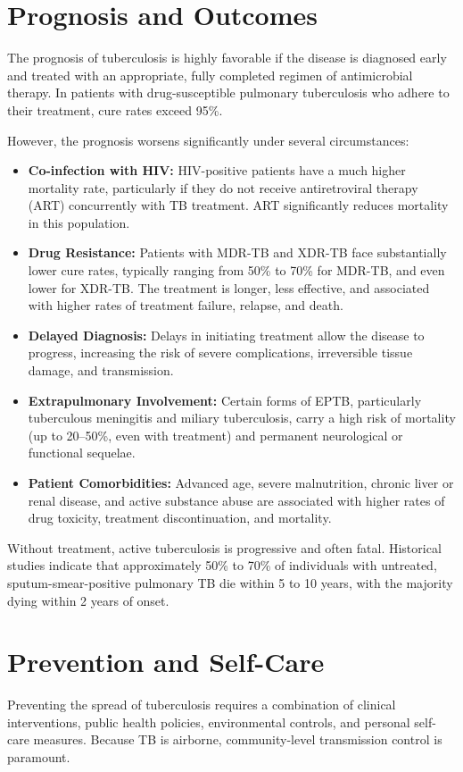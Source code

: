 \section*{Prognosis and Outcomes}
The prognosis of tuberculosis is highly favorable if the disease is diagnosed early and treated with an appropriate, fully completed regimen of antimicrobial therapy. In patients with drug-susceptible pulmonary tuberculosis who adhere to their treatment, cure rates exceed 95\%.

However, the prognosis worsens significantly under several circumstances:
\begin{itemize}
    \item \textbf{Co-infection with HIV:} HIV-positive patients have a much higher mortality rate, particularly if they do not receive antiretroviral therapy (ART) concurrently with TB treatment. ART significantly reduces mortality in this population.
    \item \textbf{Drug Resistance:} Patients with MDR-TB and XDR-TB face substantially lower cure rates, typically ranging from 50\% to 70\% for MDR-TB, and even lower for XDR-TB. The treatment is longer, less effective, and associated with higher rates of treatment failure, relapse, and death.
    \item \textbf{Delayed Diagnosis:} Delays in initiating treatment allow the disease to progress, increasing the risk of severe complications, irreversible tissue damage, and transmission.
    \item \textbf{Extrapulmonary Involvement:} Certain forms of EPTB, particularly tuberculous meningitis and miliary tuberculosis, carry a high risk of mortality (up to 20--50\%, even with treatment) and permanent neurological or functional sequelae.
    \item \textbf{Patient Comorbidities:} Advanced age, severe malnutrition, chronic liver or renal disease, and active substance abuse are associated with higher rates of drug toxicity, treatment discontinuation, and mortality.
\end{itemize}

Without treatment, active tuberculosis is progressive and often fatal. Historical studies indicate that approximately 50\% to 70\% of individuals with untreated, sputum-smear-positive pulmonary TB die within 5 to 10 years, with the majority dying within 2 years of onset.

\section*{Prevention and Self-Care}
Preventing the spread of tuberculosis requires a combination of clinical interventions, public health policies, environmental controls, and personal self-care measures. Because TB is airborne, community-level transmission control is paramount.


